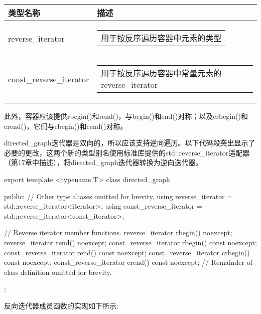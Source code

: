\begin{longtable}{|l|l|}
\hline
\textbf{类型名称}       & \textbf{描述}                                                                                                                           \\ \hline
\endfirsthead
%
\endhead
%
reverse\_iterator        & \begin{tabular}[c]{@{}l@{}}用于按反序遍历容器中元素的类型\end{tabular}                             \\ \hline
const\_reverse\_iterator & \begin{tabular}[c]{@{}l@{}}用于按反序遍历容器中常量元素的reverse\_iterator\end{tabular} \\ \hline
\end{longtable}

此外，容器应该提供rbegin()和rend()，与begin()和end()对称；以及crbegin()和crend()，它们与cbegin()和cend()对称。

directed\_graph迭代器是双向的，所以应该支持逆向遍历。以下代码段突出显示了必要的更改，这两个新的类型别名使用标准库提供的std::reverse\_iterator适配器（第17章中描述），将directed\_graph迭代器转换为逆向迭代器。

\begin{cpp}
export template <typename T>
class directed_graph
{
    public:
    // Other type aliases omitted for brevity.
    using reverse_iterator = std::reverse_iterator<iterator>;
    using const_reverse_iterator = std::reverse_iterator<const_iterator>;

    // Reverse iterator member functions.
    reverse_iterator rbegin() noexcept;
    reverse_iterator rend() noexcept;
    const_reverse_iterator rbegin() const noexcept;
    const_reverse_iterator rend() const noexcept;
    const_reverse_iterator crbegin() const noexcept;
    const_reverse_iterator crend() const noexcept;
    // Remainder of class definition omitted for brevity.
};
\end{cpp}

反向迭代器成员函数的实现如下所示:

